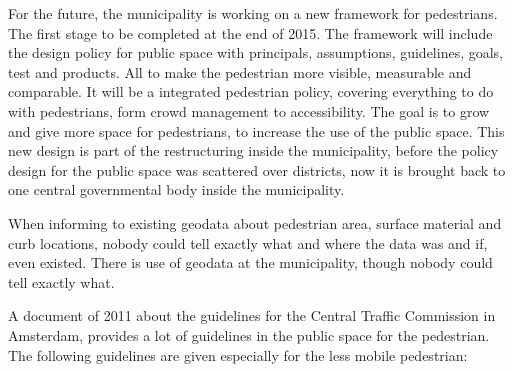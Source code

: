 For the future, the municipality is working on a new framework for pedestrians. The first stage to be completed at the end of 2015. The framework will include the design policy for public space with principals, assumptions, guidelines, goals, test and products. All to make the pedestrian more visible, measurable and comparable. It will be a integrated pedestrian policy, covering everything to do with pedestrians, form crowd management to accessibility.
The goal is to grow and give more space for pedestrians, to increase the use of the public space. This new design is part of the restructuring inside the municipality, before the policy design for the public space was scattered over districts, now it is brought back to one central governmental body inside the municipality.

When informing to existing geodata about pedestrian area, surface material and curb locations, nobody could tell exactly what and where the data was and if, even existed. There is use of geodata at the municipality, though nobody could tell exactly what. 


A document of 2011 about the guidelines for the Central Traffic Commission in Amsterdam, provides a lot of guidelines in the public space for the pedestrian. The following guidelines are given especially for the less mobile pedestrian:



